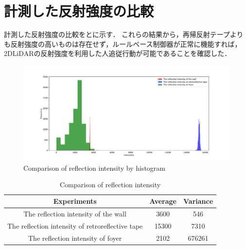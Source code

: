 \section{計測した反射強度の比較}

  計測した反射強度の比較をとに示す．
  これらの結果から，再帰反射テープよりも反射強度の高いものは存在せず，ルールベース制御器が正常に機能すれば，2DLiDARの反射強度を利用した人追従行動が可能であることを確認した．

  \vspace{0.5cm}

  \begin{figure}[h]
    \centering
    \includegraphics[width=14cm] {images/pdf/RobotGuidance_plot_reflection_intensities_of_all}
    \captionsetup{justification=raggedright} %
    \caption{Comparison of reflection intensity by histogram}
    \label{Fig:Comparison of reflection intensity by histogram}
  \end{figure}

  \vspace{0.5cm}

  \begin{table}[h]
    \caption{Comparison of reflection intensity}
    \label{tab:Comparison of reflection intensity}
    \centering
    \begin{tabular}{ccc}
    \hline
    Experiments                                      & Average & Variance \\
    \hline
    The reflection intensity of the wall             & 3600    & 546      \\
    The reflection intensity of retroreflective tape & 15300   & 7310     \\
    The reflection intensity of foyer                & 2102    & 676261  \\
    \hline
    \end{tabular}
  \end{table}

\newpage